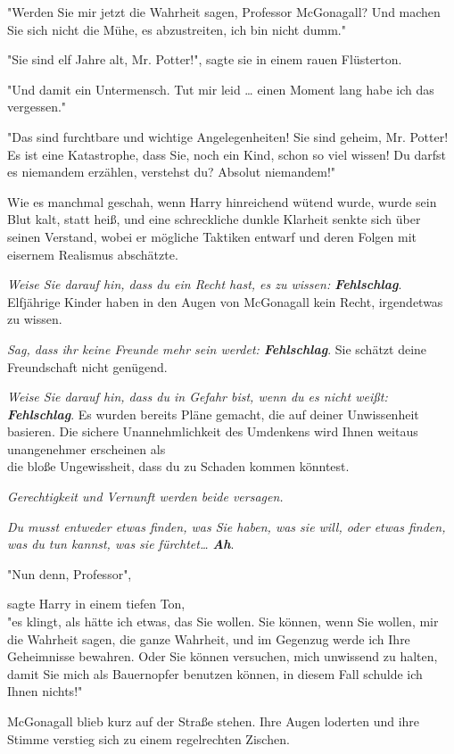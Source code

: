 {"Werden Sie mir jetzt die Wahrheit sagen, Professor McGonagall? Und machen Sie sich nicht die Mühe, es abzustreiten, ich bin nicht dumm."

"Sie sind elf Jahre alt, Mr. Potter!", sagte sie in einem rauen Flüsterton.

"Und damit ein Untermensch. Tut mir leid … einen Moment lang habe ich das vergessen."

"Das sind furchtbare und wichtige Angelegenheiten! Sie sind geheim, Mr. Potter! Es ist eine Katastrophe, dass Sie, noch ein Kind, schon so viel wissen! Du darfst es niemandem erzählen, verstehst du? Absolut niemandem!"

Wie es manchmal geschah, wenn Harry hinreichend wütend wurde, wurde sein Blut kalt, statt heiß, und eine schreckliche dunkle Klarheit senkte sich über seinen Verstand, wobei er mögliche Taktiken entwarf und deren Folgen mit eisernem Realismus abschätzte.

\emph{Weise Sie darauf hin, dass du ein Recht hast, es zu wissen: \textbf{Fehlschlag}}. Elfjährige Kinder haben in den Augen von McGonagall kein Recht, irgendetwas zu wissen.

\emph{Sag, dass ihr keine Freunde mehr sein werdet: \textbf{Fehlschlag}}. Sie schätzt deine Freundschaft nicht genügend.

\emph{Weise Sie darauf hin, dass du in Gefahr bist, wenn du es nicht weißt: \textbf{Fehlschlag}}. Es wurden bereits Pläne gemacht, die auf deiner Unwissenheit basieren. Die sichere Unannehmlichkeit des Umdenkens wird Ihnen weitaus unangenehmer erscheinen als\\ die bloße Ungewissheit, dass du zu Schaden kommen könntest.

\emph{Gerechtigkeit und Vernunft werden beide versagen.}

\emph{Du musst entweder etwas finden, was Sie haben, was sie will, oder etwas finden, was du tun kannst, was sie fürchtet… \textbf{Ah}}.

"Nun denn, Professor",

sagte Harry in einem tiefen Ton,\\ "es klingt, als hätte ich etwas, das Sie wollen. Sie können, wenn Sie wollen, mir die Wahrheit sagen, die ganze Wahrheit, und im Gegenzug werde ich Ihre Geheimnisse bewahren. Oder Sie können versuchen, mich unwissend zu halten, damit Sie mich als Bauernopfer benutzen können, in diesem Fall schulde ich Ihnen nichts!"

McGonagall blieb kurz auf der Straße stehen. Ihre Augen loderten und ihre Stimme verstieg sich zu einem regelrechten Zischen.

}
